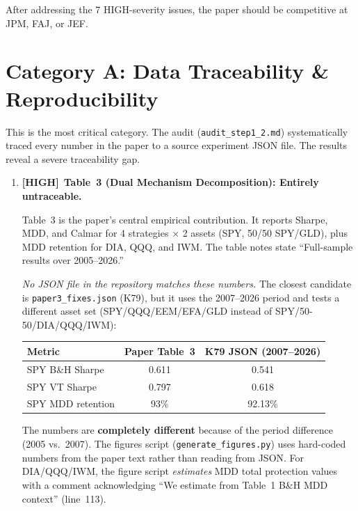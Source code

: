 \documentclass[12pt,a4paper]{article}
\newcommand{\HIGH}{\textcolor{highsev}{\textbf{[HIGH]}}}
\begin{document}
After addressing the 7 HIGH-severity issues, the paper should be competitive at JPM, FAJ, or JEF.


\section{Category A: Data Traceability \& Reproducibility}
\label{sec:traceability}

This is the most critical category. The audit (\texttt{audit\_step1\_2.md}) systematically traced every number in the paper to a source experiment JSON file. The results reveal a severe traceability gap.

\begin{enumerate}[label=\textbf{A.\arabic*}]

\item \HIGH\ \textbf{Table~3 (Dual Mechanism Decomposition): Entirely untraceable.}

Table~3 is the paper's central empirical contribution. It reports Sharpe, MDD, and Calmar for 4 strategies $\times$ 2 assets (SPY, 50/50 SPY/GLD), plus MDD retention for DIA, QQQ, and IWM. The table notes state ``Full-sample results over 2005--2026.''

\textit{No JSON file in the repository matches these numbers.} The closest candidate is \texttt{paper3\_fixes.json} (K79), but it uses the 2007--2026 period and tests a different asset set (SPY/QQQ/EEM/EFA/GLD instead of SPY/50-50/DIA/QQQ/IWM):

\begin{center}
\small
\begin{tabular}{lcc}
\toprule
Metric & Paper Table~3 & K79 JSON (2007--2026) \\
\midrule
SPY B\&H Sharpe & 0.611 & 0.541 \\
SPY VT Sharpe & 0.797 & 0.618 \\
SPY MDD retention & 93\% & 92.13\% \\
\bottomrule
\end{tabular}
\end{center}

The numbers are \textbf{completely different} because of the period difference (2005 vs.\ 2007). The figures script (\texttt{generate\_figures.py}) uses hard-coded numbers from the paper text rather than reading from JSON. For DIA/QQQ/IWM, the figure script \textit{estimates} MDD total protection values with a comment acknowledging ``We estimate from Table~1 B\&H MDD context'' (line~113).


\end{enumerate}
\end{document}
